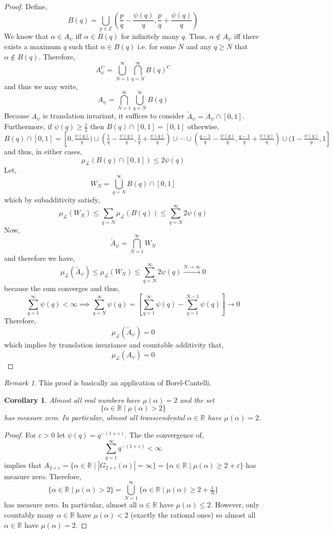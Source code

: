 \documentclass{article}
\newcommand{\Z}{\mathbb{Z}}
\newcommand{\R}{\mathbb{R}}
\theoremstyle{theorem}
\newtheorem{corollary}[theorem]{Corollary}
\theoremstyle{definition}
\theoremstyle{definition}
\theoremstyle{remark}
\theoremstyle{definition}
\theoremstyle{remark}
\newtheorem{remark}{Remark}[subsection]
\begin{document}
\begin{proof}
Define,
\[ B(q) = \bigcup_{p \in \Z} \left( \frac{p}{q} - \frac{\psi(q)}{q}, \frac{p}{q} + \frac{\psi(q)}{q} \right) \]
We know that $\alpha \in A_\psi$ iff $\alpha \in B(q)$ for infinitely many $q$. Thus, $\alpha \notin A_\psi$ iff there exists a maximum $q$ such that $\alpha \in B(q)$ i.e. for some $N$ and any $q \ge N$ that $\alpha \notin B(q)$. Therefore,
\[ A_\psi^C = \bigcup_{N = 1}^\infty \bigcap_{q = N}^\infty B(q)^C \]
and thus we may write,
\[ A_\psi = \bigcap_{N = 1}^\infty \bigcup_{q = N}^\infty B(q) \]
Because $A_\psi$ is translation invariant, it suffices to consider $\tilde{A}_\psi = A_\psi \cap [0, 1]$. Furthermore, if $\psi(q) \ge \tfrac{1}{2}$ then $B(q) \cap [0, 1] = [0, 1]$ otherwise, 
\[ B(q) \cap [0,1] = [0, \tfrac{\psi(q)}{q}) \cup (\tfrac{1}{q} - \tfrac{\psi(q)}{q}, \tfrac{1}{q} + \tfrac{\psi(q)}{q}) \cup \cdots \cup (\tfrac{q-1}{q} - \tfrac{\psi(q)}{q}, \tfrac{q-1}{q} + \tfrac{\psi(q)}{q}) \cup (1 - \tfrac{\psi(q)}{q}, 1] \]
and thus, in either cases, 
\[ \mu_{\mathcal{L}} \left( B(q) \cap [0, 1]\right) \le 2 \psi(q) \]
Let,
\[ W_N = \bigcup_{q = N}^\infty B(q) \cap [0,1] \]
which by subadditivity satisfy,
\[ \mu_{\mathcal{L}}(W_N) \le \sum_{q = N} \mu_{\mathcal{L}}(B(q)) \le \sum_{q = N}^\infty 2 \psi(q) \]
Now,
\[ \tilde{A}_\psi = \bigcap_{N = 1}^\infty W_N \]
and therefore we have,
\[ \mu_{\mathcal{L}}(\tilde{A}_\psi) \le \mu_{\mathcal{L}}(W_N) \le \sum_{q = N}^\infty 2 \psi(q) \xrightarrow{N \to \infty} 0 \]
because the sum converges and thus,
\[ \sum_{q = 1}^\infty \psi(q) < \infty \implies \sum_{q = N}^\infty \psi(q) = \left[ \sum_{q = 1}^\infty \psi(q) - \sum_{q = 1}^{N-1} \psi(q) \right] \to  0 \]
Therefore, 
\[ \mu_{\mathcal{L}}(\tilde{A}_\psi) = 0 \]
which implies by translation invariance and countable additivity that,
\[ \mu_{\mathcal{L}}(A_\psi) = 0 \]
\end{proof}

\begin{remark}
This proof is basically an application of Borel-Cantelli.
\end{remark}

\begin{corollary}
Almost all real numbers have $\mu(\alpha) = 2$ and the set
\[ \{ \alpha \in \R \mid \mu(\alpha) > 2 \} \]
has measure zero. In particular, almost all transcendental $\alpha \in \R$ have $\mu(\alpha) = 2$.  
\end{corollary}

\begin{proof}
For $\varepsilon > 0$ let $\psi(q) = q^{-(1 + \varepsilon)}$. The the convergence of,
\[ \sum_{q = 1}^\infty q^{-(1 + \varepsilon)} < \infty \]
implies that $A_{2 + \varepsilon} = \{ \alpha \in \R \mid |G_{2 + \epsilon}(\alpha)| = \infty \} = \{ \alpha \in \R \mid \mu(\alpha) \ge 2 + \varepsilon\}$ has measure zero. Therefore, 
\[ \{ \alpha \in \R \mid \mu(\alpha) > 2 \} = \bigcup_{N = 1}^\infty \{ \alpha \in \R \mid \mu(\alpha) \ge 2 + \tfrac{1}{N} \} \]
has measure zero. In particular, almost all $\alpha \in \R$ have $\mu(\alpha) \le 2$. However, only countably many $\alpha \in \R$ have $\mu(\alpha) < 2$ (exactly the rational ones) so almost all $\alpha \in \R$ have $\mu(\alpha) = 2$. 
\end{proof}
\end{document}
